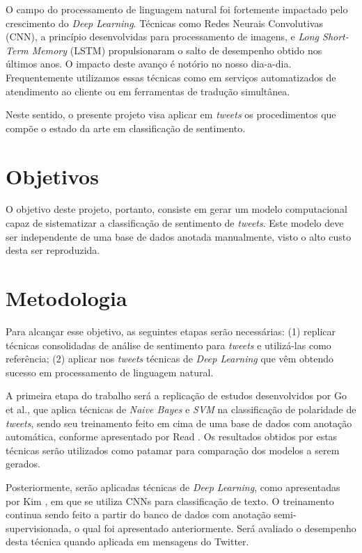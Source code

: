 O campo do processamento de linguagem natural foi fortemente impactado pelo crescimento do \textit{Deep Learning}. Técnicas como Redes Neurais Convolutivas (CNN), a princípio desenvolvidas para processamento de imagens, e \textit{Long Short-Term Memory} (LSTM) propulsionaram o salto de desempenho obtido nos últimos anos. O impacto deste avanço é notório no nosso dia-a-dia. Frequentemente utilizamos essas técnicas como em serviços automatizados de atendimento ao cliente ou em ferramentas de tradução simultânea.

Neste sentido, o presente projeto visa aplicar em \textit{tweets} os procedimentos que compõe o estado da arte em classificação de sentimento.

\section{Objetivos}

O objetivo deste projeto, portanto, consiste em gerar um modelo computacional capaz de sistematizar a classificação de sentimento de \textit{tweets}. Este modelo deve ser independente de uma base de dados anotada manualmente, visto o alto custo desta ser reproduzida.

\section{Metodologia}

Para alcançar esse objetivo, as seguintes etapas serão necessárias: (1) replicar técnicas consolidadas de análise de sentimento para \textit{tweets} e utilizá-las como referência; (2) aplicar nos \textit{tweets} técnicas de \textit{Deep Learning} que vêm obtendo sucesso em processamento de linguagem natural.

A primeira etapa do trabalho será a replicação de estudos desenvolvidos por Go et al., \cite{go09} que aplica técnicas de \textit{Naive Bayes} e \textit{SVM} na classificação de polaridade de \textit{tweets}, sendo seu treinamento feito em cima de uma base de dados com anotação automática, conforme apresentado por Read \cite{read05}. Os resultados obtidos por estas técnicas serão utilizados como patamar para comparação dos modelos a serem gerados.

Posteriormente, serão aplicadas técnicas de \textit{Deep Learning}, como apresentadas por Kim \cite{kim14}, em que se utiliza CNNs para classificação de texto. O treinamento continua sendo feito a partir do banco de dados com anotação semi-supervisionada, o qual foi apresentado anteriormente. Será avaliado o desempenho desta técnica quando aplicada em mensagens do Twitter.


